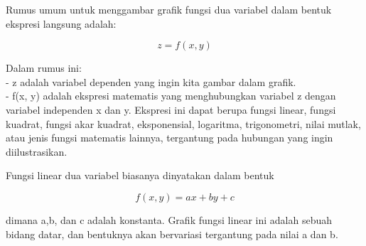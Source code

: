 \documentclass[a4paper,10pt]{article}
\begin{document}
\begin{eulernotebook}
\begin{eulercomment}
\begin{eulercomment}
\begin{eulercomment}
Rumus umum untuk menggambar grafik fungsi dua variabel dalam bentuk
ekspresi langsung adalah:\\
\end{eulercomment}
\begin{eulerformula}
\[
z = f(x, y)
\]
\end{eulerformula}
\begin{eulercomment}
Dalam rumus ini:\\
- z adalah variabel dependen yang ingin kita gambar dalam grafik.\\
- f(x, y) adalah ekspresi matematis yang menghubungkan variabel z
dengan variabel independen x dan y. Ekspresi ini dapat berupa fungsi
linear, fungsi kuadrat, fungsi akar kuadrat, eksponensial, logaritma,
trigonometri, nilai mutlak, atau jenis fungsi matematis lainnya,
tergantung pada hubungan yang ingin diilustrasikan.

\end{eulercomment}
\begin{eulercomment}
Fungsi linear dua variabel biasanya dinyatakan dalam bentuk\\
\end{eulercomment}
\begin{eulerformula}
\[
f(x,y)=ax+by+c
\]
\end{eulerformula}
\begin{eulercomment}
dimana a,b, dan c adalah konstanta.  Grafik fungsi linear ini adalah
sebuah bidang datar, dan bentuknya akan bervariasi tergantung pada
nilai a dan b.


\end{eulercomment}
\end{eulercomment}
\end{eulercomment}
\end{eulernotebook}
\end{document}
